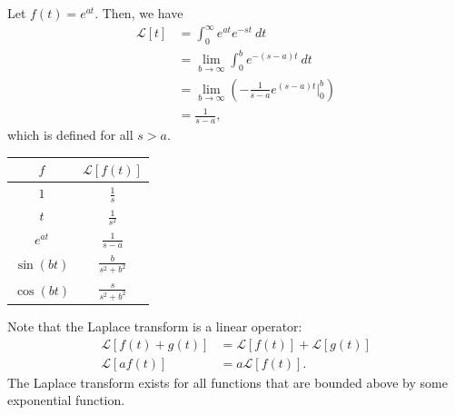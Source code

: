 \documentclass[10pt]{mypackage}
\begin{document}
\begin{example}
  Let $f(t) = e^{at}$. Then, we have
  \begin{align*}
    \mathcal{L}\left[t\right] &= \int_{0}^{\infty} e^{at}e^{-st}\:dt\\
                              &= \lim_{b\rightarrow\infty}\int_{0}^{b} e^{-\left(s-a\right)t}\:dt\\
                              &= \lim_{b\rightarrow\infty}\left(-\frac{1}{s-a}e^{\left(s-a\right)t}\bigr\vert_{0}^{b}\right)\\
                              &= \frac{1}{s-a},
  \end{align*}
  which is defined for all $s > a$.
\end{example}
\begin{center}
  \renewcommand{\arraystretch}{1.75}
  \begin{tabular}{c|c}
    $f$ & $\mathcal{L}\left[f(t)\right]$\\
    \hline
    $1$ & $\displaystyle\frac{1}{s} $\\
    $t$ & $\displaystyle\frac{1}{s^2} $\\
    $e^{at}$ & $\displaystyle\frac{1}{s-a} $\\
    $\sin\left(bt\right)$ & $\displaystyle\frac{b}{s^2 + b^2} $\\
    $\cos\left(bt\right)$ & $\displaystyle\frac{s}{s^2 + b^2} $
  \end{tabular}
\end{center}
Note that the Laplace transform is a linear operator:
\begin{align*}
  \mathcal{L}\left[f(t) + g(t)\right] &= \mathcal{L}\left[f(t)\right] + \mathcal{L}\left[g(t)\right]\\
  \mathcal{L}\left[af(t)\right] &= a\mathcal{L}\left[f(t)\right].
\end{align*}
The Laplace transform exists for all functions that are bounded above by some exponential function.
\end{document}
